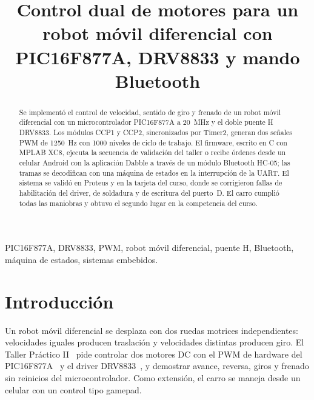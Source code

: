 \documentclass[conference,letterpaper]{IEEEtran}
\begin{document}
\title{Control dual de motores para un robot móvil diferencial con
PIC16F877A, DRV8833 y mando Bluetooth}

\author{
}

\maketitle

\begin{abstract}
Se implementó el control de velocidad, sentido de giro y frenado de un robot
móvil diferencial con un microcontrolador PIC16F877A a \SI{20}{\mega\hertz} y
el doble puente H DRV8833. Los módulos CCP1 y CCP2, sincronizados por Timer2,
generan dos señales PWM de \SI{1250}{\hertz} con 1000 niveles de ciclo de
trabajo. El firmware, escrito en C con MPLAB XC8, ejecuta la secuencia de
validación del taller o recibe órdenes desde un celular Android con la
aplicación Dabble a través de un módulo Bluetooth HC-05; las tramas se
decodifican con una máquina de estados en la interrupción de la UART. El
sistema se validó en Proteus y en la tarjeta del curso, donde se corrigieron
fallas de habilitación del driver, de soldadura y de escritura del puerto~D.
El carro cumplió todas las maniobras y obtuvo el segundo lugar en la
competencia del curso.
\end{abstract}

\begin{IEEEkeywords}
PIC16F877A, DRV8833, PWM, robot móvil diferencial, puente H, Bluetooth,
máquina de estados, sistemas embebidos.
\end{IEEEkeywords}

\section{Introducción}

Un robot móvil diferencial se desplaza con dos ruedas motrices
independientes: velocidades iguales producen traslación y velocidades
distintas producen giro. El Taller Práctico II~\cite{guia} pide controlar dos
motores DC con el PWM de hardware del PIC16F877A~\cite{pic16f877a} y el driver
DRV8833~\cite{drv8833}, y demostrar avance, reversa, giros y frenado sin
reinicios del microcontrolador. Como extensión, el carro se maneja desde un
celular con un control tipo gamepad.
\end{document}
